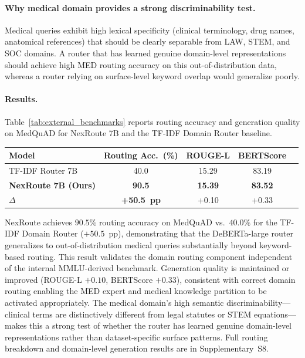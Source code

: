 \documentclass[a4paper,fleql,doubleblind]{cas-sc}
\begin{document}
\paragraph{Why medical domain provides a strong discriminability test.}
Medical queries exhibit high lexical specificity (clinical terminology, drug names,
anatomical references) that should be clearly separable from LAW, STEM, and SOC
domains. A router that has learned genuine domain-level representations should
achieve high MED routing accuracy on this out-of-distribution data, whereas a
router relying on surface-level keyword overlap would generalize poorly.

\paragraph{Results.}
Table~\ref{tab:external_benchmarks} reports routing accuracy and generation quality
on MedQuAD for NexRoute 7B and the TF-IDF Domain Router baseline.

\vspace{4pt}
\begin{center}
\begingroup
{}
\label{tab:external_benchmarks}
\renewcommand{\arraystretch}{1.2}
\begin{tabular}{lcccc}
\toprule
\textbf{Model} & \textbf{Routing Acc.\ (\%)} & \textbf{ROUGE-L} & \textbf{BERTScore} \\
\midrule
TF-IDF Router 7B  & 40.0 & 15.29 & 83.19 \\
\textbf{NexRoute 7B (Ours)}   & \textbf{90.5} & \textbf{15.39} & \textbf{83.52} \\
\midrule
$\Delta$       & \textbf{+50.5~pp} & +0.10 & +0.33 \\
\bottomrule
\end{tabular}
\endgroup
\end{center}
\vspace{4pt}

NexRoute achieves $90.5\%$ routing accuracy on MedQuAD vs.\ $40.0\%$ for the TF-IDF
Domain Router ($+50.5$~pp), demonstrating that the DeBERTa-large router generalizes
to out-of-distribution medical queries substantially beyond keyword-based routing.
This result validates the domain routing component independent of the internal
MMLU-derived benchmark.
Generation quality is maintained or improved (ROUGE-L $+0.10$, BERTScore $+0.33$),
consistent with correct domain routing enabling the MED expert and medical knowledge
partition to be activated appropriately.
The medical domain's high semantic discriminability---clinical terms are distinctively
different from legal statutes or STEM equations---makes this a strong test of whether
the router has learned genuine domain-level representations rather than dataset-specific
surface patterns.
Full routing breakdown and domain-level generation results are in Supplementary~S8.
\end{document}
